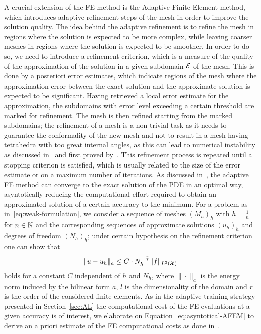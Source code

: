 A crucial extension of the FE method is the Adaptive Finite Element method, which introduces adaptive refinement steps of the mesh in order to improve the solution quality.
The idea behind the adaptive refinement is to refine the mesh in regions where the solution is expected to be more complex, while leaving coarser meshes in regions where the solution is expected to be smoother.
In order to do so, we need to introduce a refinement criterion, which is a measure of the quality of the approximation of the solution in a given subdomain $\mathcal E$ of the mesh.
This is done by a posteriori error estimates, which indicate regions of the mesh where the approximation error between the exact solution and the approximate solution is expected to be significant.
Having retrieved a local error estimate for the approximation, the subdomains with error level exceeding a certain threshold are marked for refinement.
The mesh is then refined starting from the marked subdomains; the refinement of a mesh is a non trivial task as it needs to guarantee the conformality of the new mesh and not to result in a mesh having tetrahedra with too great internal angles, as this can lead to numerical instability as discussed in~\cite[Section 4.4.3]{DeuflhardWeiser2012} and first proved by~\cite{SyngeRheinboldt1957}.
This refinement process is repeated until a stopping criterion is satisfied, which is usually related to the size of the error estimate or on a maximum number of iterations.\newline
As discussed in~\cite[Chapter 6.3]{DeuflhardWeiser2012}, the adaptive FE method can converge to the exact solution of the PDE in an optimal way, asyntotically reducing the computational effort required to obtain an approximated solution of a certain accuracy to the minimum. 
For a problem as in~\eqref{eq:weak-formulation}, we consider a sequence of meshes $(M_h)_h$ with $h= \frac{1}{n}$ for $n\in \mathbb N$ and the corresponding sequences of approximate solutions $(u_h)_h$ and degrees of freedom $(N_h)_h$; under certain hypothesis on the refinement criterion one can show that 
\begin{equation}\label{eq:asyntotical-AFEM}
    \| u - u_h \|_a \leq C \cdot N_h^{-\frac{r}{l}} \|f\|_{L^2(\mathcal X)} 
\end{equation}
holds for a constant $C$ independent of $h$ and $N_h$, where $\| \cdot \|_a$ is the energy norm induced by the bilinear form $a$, $l$ is the dimensionality of the domain and $r$ is the order of the considered finite elements. \newline
As in the adaptive training strategy presented in Section~\ref{sec:AL} the computational cost of the FE evaluations at a given accuracy is of interest, we elaborate on Equation~\eqref{eq:asyntotical-AFEM} to derive an a priori estimate of the FE computational costs as done in~\cite{SemlerWeiser2023}.
